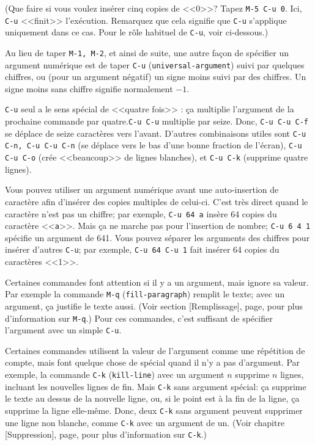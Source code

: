 (Que faire si vous voulez insérer cinq copies de <<$0$>>? Tapez
\texttt{M-5 C-u 0}. Ici, \texttt{C-u} <<finit>> l'exécution. Remarquez
que cela signifie que \texttt{C-u} s'applique uniquement dans ce
cas. Pour le rôle habituel de \texttt{C-u}, voir ci-dessous.)\par

Au lieu de taper \texttt{M-1, M-2}, et ainsi de suite, une autre façon
de spécifier un argument numérique est de taper \texttt{C-u}
(\texttt{universal-argument}) suivi par quelques chiffres, ou (pour un
argument négatif) un signe moins suivi par des chiffres. Un signe
moins sans chiffre signifie normalement $-1$.\par

\texttt{C-u} seul a le sens spécial de <<quatre fois>> : \c{c}a
multiplie l'argument de la prochaine commande par quatre.\texttt{C-u
  C-u} multiplie par seize. Donc, \texttt{C-u C-u C-f} se déplace de
seize caractères vers l'avant. D'autres combinaisons utiles sont
\texttt{C-u C-n, C-u C-u C-n} (se déplace vers le bas d'une bonne
fraction de l'écran), \texttt{C-u C-u C-o} (crée <<beaucoup>> de
lignes blanches), et \texttt{C-u C-k} (supprime quatre lignes). \par

Vous pouvez utiliser un argument numérique avant une auto-insertion de
caractère afin d'insérer des copies multiples de celui-ci. C'est très
direct quand le caractère n'est pas un chiffre; par exemple,
\texttt{C-u 64 a} insère 64 copies du caractère <<\texttt{a}>>. Mais
\c{c}a ne marche pas pour l'insertion de nombre; \texttt{C-u 6 4 1}
spécifie un argument de 641. Vous pouvez séparer les arguments des
chiffres pour insérer d'autres \texttt{C-u}; par exemple, \texttt{C-u
  64 C-u 1} fait insérer 64 copies du caractères <<1>>.\par

Certaines commandes font attention si il y a un argument, mais ignore
sa valeur. Par exemple la commande \texttt{M-q}
(\texttt{fill-paragraph}) remplit le texte; avec un argument, \c{c}a
justifie le texte aussi. (Voir section [Remplissage],
page, pour plus d'information sur \texttt{M-q}.) Pour
ces commandes, c'est suffisant de spécifier l'argument avec un simple
\texttt{C-u}.\par

Certaines commandes utilisent la valeur de l'argument comme une
répétition de compte, mais font quelque chose de spécial quand il n'y
a pas d'argument. Par exemple, la commande \texttt{C-k}
(\texttt{kill-line}) avec un argument $n$ supprime $n$ lignes,
incluant les nouvelles lignes de fin. Mais \texttt{C-k} sans argument
spécial: \c{c}a supprime le texte au dessus de la nouvelle ligne, ou,
si le point est à la fin de la ligne, \c{c}a supprime la ligne
elle-même. Donc, deux \texttt{C-k} sans argument peuvent supprimer une
ligne non blanche, comme \texttt{C-k} avec un argument de un. (Voir
chapitre [Suppression], page, pour plus d'information
sur \texttt{C-k}.)\par

